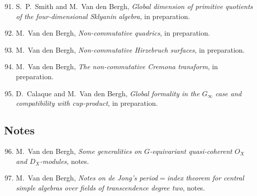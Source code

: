 \begin{enumerate}
\setcounter{enumi}{90}
\item
S.~P.~Smith and M.~Van den Bergh, {\em Global dimension of primitive quotients of the four-dimensional Sklyanin algebra}, in preparation.

\item
M.~Van den Bergh, {\em Non-commutative quadrics}, in preparation.

\item
M.~Van den Bergh, {\em Non-commutative Hirzebruch surfaces}, in preparation.

\item
M.~Van den Bergh, {\em The non-commutative Cremona transform}, in preparation.

\item
D.~Calaque and M.~Van den Bergh, {\em Global formality in the $G_\infty$ case and compatibility with cup-product}, in preparation.

\end{enumerate}


\subsection*{Notes}

\begin{enumerate}
\setcounter{enumi}{95}
\item
M.~Van den Bergh, {\em Some generalities on $G$-equivariant quasi-coherent $O_X$ and $D_X$-modules}, notes.

\item
M.~Van den Bergh, {\em Notes on de Jong's period$=$index theorem for central simple algebras over fields of transcendence degree two}, notes.

\end{enumerate}

